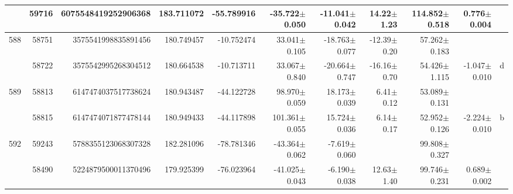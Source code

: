 \documentclass{ws-ijmpd}
\begin{document}
\begin{landscape}
\begin{longtable}{rrrrrrrrrrl}
            &   59716 &      6075548419252906368 &                   183.711072 &                   -55.789916 &                -35.722$\pm$0.050 &                -11.041$\pm$0.042 &          14.22$\pm$  1.23 &       114.852$\pm$0.518 &                           0.776$\pm$0.004 &                                                    \\
 \hline 588 &   58751 &      3575541998835891456 &                   180.749457 &                   -10.752474 &                 33.041$\pm$0.105 &                -18.763$\pm$0.077 &         -12.39$\pm$  0.20 &        57.262$\pm$0.183 &                                           &                                                    \\
            &   58722 &      3575542995268304512 &                   180.664538 &                   -10.713711 &                 33.067$\pm$0.840 &                -20.664$\pm$0.747 &         -16.16$\pm$  0.70 &        54.426$\pm$1.115 &                          -1.047$\pm$0.010 &                                                  d \\
 \hline 589 &   58813 &      6147474037517738624 &                   180.943487 &                   -44.122728 &                 98.970$\pm$0.059 &                 18.173$\pm$0.039 &           6.41$\pm$  0.12 &        53.089$\pm$0.131 &                                           &                                                    \\
            &   58815 &      6147474071877478144 &                   180.949433 &                   -44.117898 &                101.361$\pm$0.055 &                 15.724$\pm$0.036 &           6.14$\pm$  0.17 &        52.952$\pm$0.126 &                          -2.224$\pm$0.010 &                                                  b \\
 \hline 592 &   59243 &      5788355123068307328 &                   182.281096 &                   -78.781346 &                -43.364$\pm$0.062 &                 -7.619$\pm$0.060 &                           &        99.808$\pm$0.327 &                                           &                                                    \\
            &   58490 &      5224879500011370496 &                   179.925399 &                   -76.023964 &                -41.025$\pm$0.043 &                 -6.190$\pm$0.038 &          12.63$\pm$  1.40 &        99.746$\pm$0.231 &                           0.689$\pm$0.002 &                                                    \\

\end{longtable}
\end{landscape}
\end{document}
